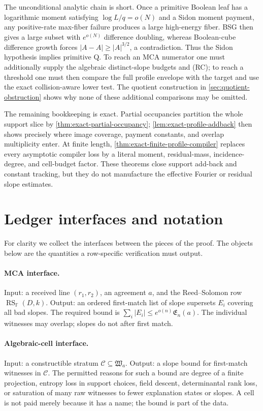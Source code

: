 \documentclass[12pt,a4paper]{amsart}
\numberwithin{equation}{section}
\theoremstyle{remark}
\DeclareMathOperator{\RS}{RS}
\newcommand{\F}{\mathbb F}
\newcommand{\Ccal}{\mathcal C}
\newcommand{\abs}[1]{\lvert #1\rvert}
\begin{document}
The unconditional analytic chain is short.  Once a primitive Boolean leaf
has a logarithmic moment satisfying \(\log L/q=o(N)\) and a Sidon moment
payment, any
positive-rate max-fiber failure produces a large high-energy fiber.  BSG
then gives a large subset with \(e^{o(N)}\) difference doubling, whereas
Boolean-cube difference growth forces \(\abs{A-A}\ge\abs A^{3/2}\), a
contradiction.  Thus the Sidon hypothesis implies primitive Q.  To reach an
MCA numerator one must additionally supply the algebraic distinct-slope
budgets and \textup{(RC)}; to reach a threshold one must then compare the
full profile envelope with the target and use the exact collision-aware
lower test.  The quotient construction in \cref{sec:quotient-obstruction}
shows why none of these additional comparisons may be omitted.

The remaining bookkeeping is exact.  Partial occupancies partition the
whole support slice by \cref{thm:exact-partial-occupancy};
\cref{lem:exact-profile-addback} then shows precisely where image coverage,
payment constants, and overlap multiplicity enter.  At finite length,
\cref{thm:exact-finite-profile-compiler} replaces every asymptotic compiler
loss by a literal moment, residual-mass, incidence-degree, and cell-budget
factor.  These theorems close support add-back and constant tracking, but
they do not manufacture the effective Fourier or residual slope estimates.


\section{Ledger interfaces and notation}\label{sec:interfaces}

For clarity we collect the interfaces between the pieces of the proof.  The objects below are the quantities a row-specific verification must output.

\paragraph{MCA interface.}
Input: a received line \((r_1,r_2)\), an agreement \(a\), and the Reed--Solomon row \(\RS_\F(D,k)\).  Output: an ordered first-match list of slope supersets \(E_i\) covering all bad slopes.  The required bound is \(\sum_i\abs{E_i}\le e^{o(n)}\mathfrak E_n(a)\).  The individual witnesses may overlap; slopes do not after first match.

\paragraph{Algebraic-cell interface.}
Input: a constructible stratum \(\Ccal\subseteq\mathfrak W_a\).  Output: a slope bound for first-match witnesses in \(\Ccal\).  The permitted reasons for such a bound are degree of a finite projection, entropy loss in support choices, field descent, determinantal rank loss, or saturation of many raw witnesses to fewer explanation states or slopes.  A cell is not paid merely because it has a name; the bound is part of the data.
\end{document}
